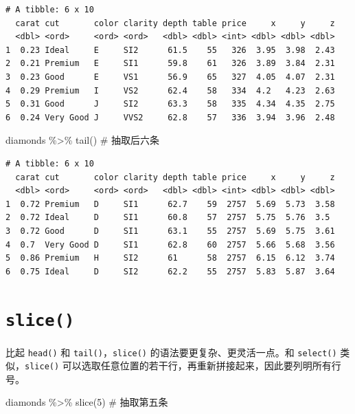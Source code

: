\documentclass[
  letterpaper,
]{ctexbook}
\newenvironment{Shaded}{\begin{snugshade}}{\end{snugshade}}
\newcommand{\CommentTok}[1]{\textcolor[rgb]{0.37,0.37,0.37}{#1}}
\newcommand{\DecValTok}[1]{\textcolor[rgb]{0.68,0.00,0.00}{#1}}
\newcommand{\FunctionTok}[1]{\textcolor[rgb]{0.28,0.35,0.67}{#1}}
\newcommand{\NormalTok}[1]{\textcolor[rgb]{0.00,0.23,0.31}{#1}}
\newcommand{\SpecialCharTok}[1]{\textcolor[rgb]{0.37,0.37,0.37}{#1}}
\begin{document}
\begin{verbatim}
# A tibble: 6 x 10
  carat cut       color clarity depth table price     x     y     z
  <dbl> <ord>     <ord> <ord>   <dbl> <dbl> <int> <dbl> <dbl> <dbl>
1  0.23 Ideal     E     SI2      61.5    55   326  3.95  3.98  2.43
2  0.21 Premium   E     SI1      59.8    61   326  3.89  3.84  2.31
3  0.23 Good      E     VS1      56.9    65   327  4.05  4.07  2.31
4  0.29 Premium   I     VS2      62.4    58   334  4.2   4.23  2.63
5  0.31 Good      J     SI2      63.3    58   335  4.34  4.35  2.75
6  0.24 Very Good J     VVS2     62.8    57   336  3.94  3.96  2.48
\end{verbatim}

\begin{Shaded}
\begin{Highlighting}[]
\NormalTok{diamonds }\SpecialCharTok{\%\textgreater{}\%}
  \FunctionTok{tail}\NormalTok{() }\CommentTok{\# 抽取后六条}
\end{Highlighting}
\end{Shaded}

\begin{verbatim}
# A tibble: 6 x 10
  carat cut       color clarity depth table price     x     y     z
  <dbl> <ord>     <ord> <ord>   <dbl> <dbl> <int> <dbl> <dbl> <dbl>
1  0.72 Premium   D     SI1      62.7    59  2757  5.69  5.73  3.58
2  0.72 Ideal     D     SI1      60.8    57  2757  5.75  5.76  3.5 
3  0.72 Good      D     SI1      63.1    55  2757  5.69  5.75  3.61
4  0.7  Very Good D     SI1      62.8    60  2757  5.66  5.68  3.56
5  0.86 Premium   H     SI2      61      58  2757  6.15  6.12  3.74
6  0.75 Ideal     D     SI2      62.2    55  2757  5.83  5.87  3.64
\end{verbatim}

\hypertarget{slice}{%
\section{\texorpdfstring{\texttt{slice()}}{slice()}}\label{slice}}

比起 \texttt{head()} 和 \texttt{tail()}，\texttt{slice()}
的语法要更复杂、更灵活一点。和 \texttt{select()} 类似，\texttt{slice()}
可以选取任意位置的若干行，再重新拼接起来，因此要列明所有行号。

\begin{Shaded}
\begin{Highlighting}[]
\NormalTok{diamonds }\SpecialCharTok{\%\textgreater{}\%}
  \FunctionTok{slice}\NormalTok{(}\DecValTok{5}\NormalTok{) }\CommentTok{\# 抽取第五条}
\end{Highlighting}
\end{Shaded}
\end{document}
